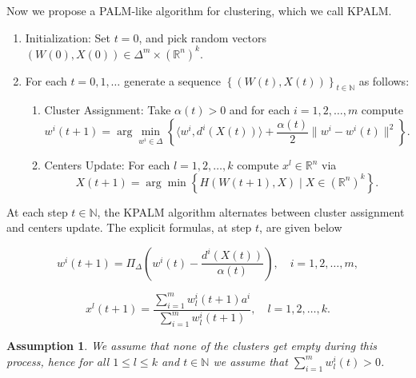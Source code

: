 \documentclass[11pt]{article}
\numberwithin{equation}{section}
\newtheorem{assumption}{Assumption}
\begin{document}
Now we propose a PALM-like algorithm for clustering, which we call KPALM.
\begin{enumerate}[(1)]
	\item Initialization: Set $t=0$, and pick random vectors $(W(0),X(0)) \in \Delta^m \times (\mathbb{R}^n)^k .$

	\item For each $t=0,1, \ldots$ generate a sequence $\left\lbrace(W(t),X(t))\right\rbrace_{t \in \mathbb{N}}$ as follows:
	\begin{enumerate}[(2.1)]
		\item Cluster Assignment: Take $\alpha(t) > 0$ and for each $i=1, 2, \ldots ,m$ compute
		\begin{equation}
			w^i(t+1) = \arg\min\limits_{w^i \in \Delta} \left\lbrace \langle w^i , d^i(X(t)) \rangle + \frac{\alpha(t)}{2} \|w^i - w^i(t)\|^2 \right\rbrace . \label{StateEq5}
		\end{equation}
		
		\item Centers Update: For each $l=1, 2, \ldots ,k$ compute $x^l \in \mathbb{R}^n$ via
		\begin{equation}
			X(t+1) = \arg\min \left\lbrace H(W(t+1), X) \mid X \in (\mathbb{R}^n)^k \right\rbrace . \label{StateEq6}
		\end{equation}
	\end{enumerate}
\end{enumerate}

\newpage

At each step $t \in \mathbb{N}$, the KPALM algorithm alternates between cluster assignment and centers update. The explicit formulas, at step $t$, are given below

\begin{equation}
w^i(t+1) = \Pi_{\Delta} \left(w^i(t) - \frac{d^i(X(t))}{\alpha(t)}\right) , \quad i=1, 2, \ldots ,m , \label{StateEq7}
\end{equation}

\begin{equation}
x^l(t+1) = \frac{\sum_{i=1}^{m} w^i_l(t+1) a^i}{\sum_{i=1}^{m} w^i_l(t+1)} , \quad l=1, 2, \ldots ,k . \label{StateEq8}
\end{equation}

\begin{assumption} \label{StateEq17}
We assume that none of the clusters get empty during this process, hence for all $1 \leq l \leq k$ and $t \in \mathbb{N}$ we assume that $\sum\limits_{i=1}^{m} w^i_l(t) > 0$.
\end{assumption}
	
\end{document}

